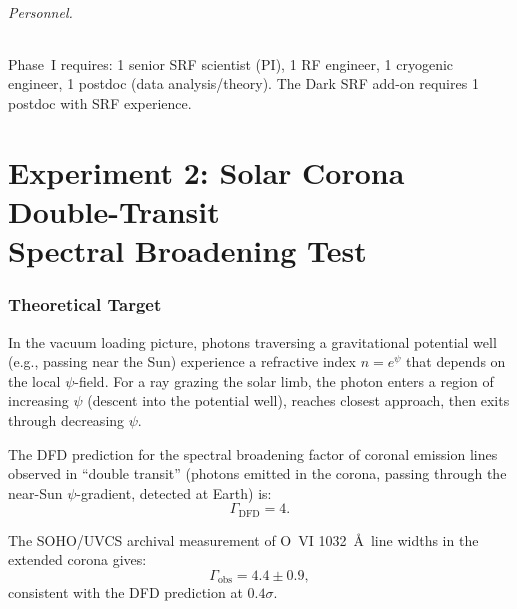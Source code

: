 \documentclass[11pt]{article}
\begin{document}
\paragraph{Personnel.}
Phase~I requires: 1 senior SRF scientist (PI), 1 RF engineer,
1 cryogenic engineer, 1 postdoc (data analysis/theory).
The Dark SRF add-on requires 1 postdoc with SRF experience.


\part{Experiment 2: Solar Corona Double-Transit\\
Spectral Broadening Test}
\label{part:corona}


\section{Theoretical Target}
\label{sec:corona-target}

In the vacuum loading picture, photons traversing a gravitational
potential well (e.g., passing near the Sun) experience a refractive
index $n = e^\psi$ that depends on the local $\psi$-field.  For a
ray grazing the solar limb, the photon enters a region of increasing
$\psi$ (descent into the potential well), reaches closest approach,
then exits through decreasing $\psi$.

The DFD prediction for the spectral broadening factor of coronal
emission lines observed in ``double transit'' (photons emitted in
the corona, passing through the near-Sun $\psi$-gradient, detected
at Earth) is:
\begin{equation}
\Gamma_{\text{DFD}} = 4.
\label{eq:Gamma-DFD}
\end{equation}

The SOHO/UVCS archival measurement of O~VI 1032~\AA\ line widths
in the extended corona gives:
\begin{equation}
\Gamma_{\text{obs}} = 4.4 \pm 0.9,
\end{equation}
consistent with the DFD prediction at $0.4\sigma$.
\end{document}

